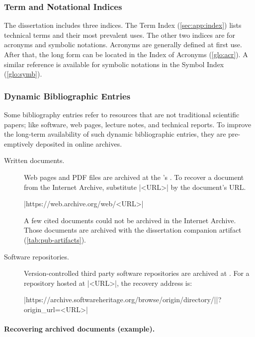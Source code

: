 \subsubsection{Term and Notational Indices}

The dissertation includes three indices.
The Term Index (\autoref{sec:app:index}) lists technical terms and their most prevalent uses.
The other two indices are for acronyms and symbolic notations.
Acronyms are generally defined at first use.
After that, the long form can be located in the Index of Acronyms (\autoref{glo:acr}).
A similar reference is available for symbolic notations in the Symbol Index (\autoref{glo:symb}).

\subsubsection{Dynamic Bibliographic Entries}

Some bibliography entries refer to resources that are not traditional scientific papers;
like software, web pages, lecture notes, and technical reports.
To improve the long-term availability of such dynamic bibliographic entries, they are pre-emptively deposited in online archives.

\begin{description}
\item[Written documents.]
Web pages and PDF files are archived at the 's .
To recover a document from the Internet Archive, substitute \pr|<URL>| by the document's URL.
\begin{center}\pr|https://web.archive.org/web/<URL>|\end{center}
A few cited documents could not be archived in the Internet Archive.
Those documents are archived with the dissertation companion artifact (\autoref{tab:pub-artifacts}).

\item[Software repositories.]
Version-controlled third party software repositories are archived at
\href{https://softwareheritage.org}{}.
For a repository hosted at \pr|<URL>|, the recovery address is:%
\begin{center}\pr|https://archive.softwareheritage.org/browse/origin/directory/|\mbox{\pr|?origin_url=<URL>|}\end{center}
\end{description}

\paragraph*{Recovering archived documents (example).}\mbox{}

